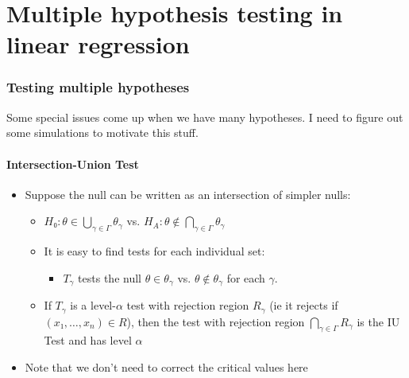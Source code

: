 

\part*{Multiple hypothesis testing in linear regression}%


\section{Testing multiple hypotheses}

Some special issues come up when we have many hypotheses.  I need to
figure out some simulations to motivate this stuff.

\subsection{Intersection-Union Test}

\begin{itemize}
\item Suppose the null can be written as an intersection of simpler
  nulls:
  \begin{itemize}
  \item $H₀: θ ∈ ⋃_{γ ∈ Γ} θ_γ$ vs.  $H_A: θ ∉ ⋂_{γ ∈ Γ} θ_γ$
  \item It is easy to find tests for each individual set:
    \begin{itemize}
    \item $T_γ$ tests the null $θ ∈ θ_γ$ vs. $θ ∉ θ_γ$ for each $γ$.
    \end{itemize}
  \item If $T_γ$ is a level-$α$ test with rejection region $R_γ$ (ie
    it rejects if $(x₁,…,x_n) ∈ R$), then the test with rejection
    region $⋂_{γ ∈ Γ} R_γ$ is the IU Test and has level $α$
  \end{itemize}
\item Note that we don't need to correct the critical values here
\end{itemize}

